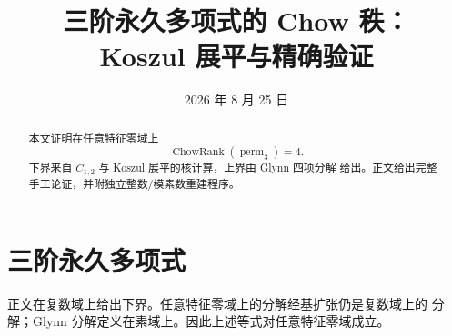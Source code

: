 \documentclass[10pt,a4paper,reqno]{amsart}
\title{三阶永久多项式的 Chow 秩：\\Koszul 展平与精确验证}
\author{}
\date{2026 年 8 月 25 日}
\theoremstyle{definition}
\newcommand{\ChowRank}{\operatorname{ChowRank}}
\newcommand{\perm}{\operatorname{perm}}
\begin{document}
\begin{abstract}
本文证明在任意特征零域上
\[
  \ChowRank(\perm_3)=4.
\]
下界来自 \(C_{1,2}\) 与 Koszul 展平的核计算，上界由 Glynn 四项分解
给出。正文给出完整手工论证，并附独立整数/模素数重建程序。
\end{abstract}
\maketitle

\section{三阶永久多项式}


正文在复数域上给出下界。任意特征零域上的分解经基扩张仍是复数域上的
分解；Glynn 分解定义在素域上。因此上述等式对任意特征零域成立。
\end{document}
